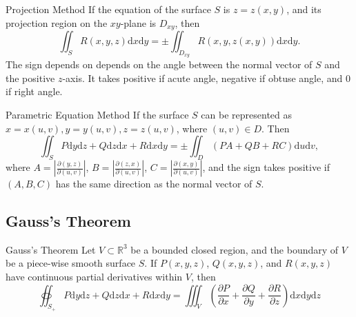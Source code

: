 \begin{proposition}{Projection Method}{}
  If the equation of the surface $S$ is $z = z(x,y)$, and its projection region
  on the $xy$-plane is $D_{xy}$, then
  \begin{equation}
    \iint_S R(x,y,z)\mathrm{d}x\mathrm{d}y = \pm \iint_{D_{xy}} R(x,y,z(x,y))\mathrm{d}x\mathrm{d}y.
  \end{equation}
  The sign depends on depends on the angle between the normal vector of $S$ and
  the positive $z$-axis. It takes positive if acute angle,
  negative if obtuse angle, and $0$ if right angle.
\end{proposition}

\begin{proposition}{Parametric Equation Method}{}
  If the surface $S$ can be represented as $x = x(u,v), y = y(u,v), z = z(u,v)$,
  where $(u,v) \in D$. Then
  \begin{equation}
    \iint_S P\mathrm{d}y\mathrm{d}z + Q\mathrm{d}z\mathrm{d}x + R\mathrm{d}x\mathrm{d}y
    = \pm \iint_D (PA + QB + RC)\mathrm{d}u\mathrm{d}v,
  \end{equation}
  where $A = |\frac{\partial(y,z)}{\partial(u,v)}|$, $B =
  |\frac{\partial(z,x)}{\partial(u,v)}|$, $C = |\frac{\partial(x,y)}{\partial(u,v)}|$,
  and the sign takes positive if $(A, B, C)$ has the same direction as the
  normal vector of $S$.
\end{proposition}


\subsection{Gauss's Theorem}

\begin{theorem}{Gauss's Theorem}{}
  Let $V \subset \mathbb{R}^3$ be a bounded closed region, and the boundary of
  $V$ be a piece-wise smooth surface $S$. If $P(x,y,z)$, $Q(x,y,z)$, and $R(x,y,z)$ have continuous
  partial derivatives within $V$, then
  \begin{equation}
    \oiint _{S_+}P\mathrm{d}y \mathrm{d}z + Q \mathrm{d}z \mathrm{d}x + R \mathrm{d}x \mathrm{d}y = \iiint_V (\frac{\partial P}{\partial x} + \frac{\partial Q}{\partial y} + \frac{\partial R}{\partial z})\mathrm{d}x \mathrm{d}y \mathrm{d}z
  \end{equation}
\end{theorem}



